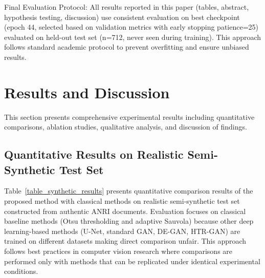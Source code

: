 \documentclass[journal]{IEEEtran}
\begin{document}
Final Evaluation Protocol: All results reported in this paper (tables, abstract, hypothesis testing, discussion) use consistent evaluation on best checkpoint (epoch 44, selected based on validation metrics with early stopping patience=25) evaluated on held-out test set (n=712, never seen during training). This approach follows standard academic protocol to prevent overfitting and ensure unbiased results.

\section{Results and Discussion}

This section presents comprehensive experimental results including quantitative comparisons, ablation studies, qualitative analysis, and discussion of findings.

\subsection{Quantitative Results on Realistic Semi-Synthetic Test Set}

Table~\ref{table_synthetic_results} presents quantitative comparison results of the proposed method with classical methods on realistic semi-synthetic test set constructed from authentic ANRI documents. Evaluation focuses on classical baseline methods (Otsu thresholding and adaptive Sauvola) because other deep learning-based methods (U-Net, standard GAN, DE-GAN, HTR-GAN) are trained on different datasets making direct comparison unfair. This approach follows best practices in computer vision research where comparisons are performed only with methods that can be replicated under identical experimental conditions.
\end{document}
